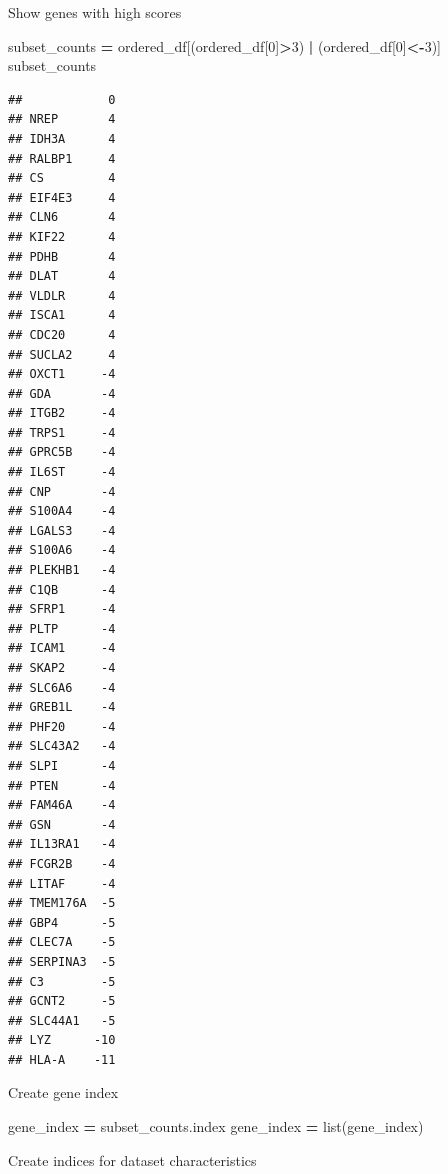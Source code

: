 \documentclass[
]{article}
\newenvironment{Shaded}{\begin{snugshade}}{\end{snugshade}}
\newcommand{\BuiltInTok}[1]{#1}
\newcommand{\CommentTok}[1]{\textcolor[rgb]{0.56,0.35,0.01}{\textit{#1}}}
\newcommand{\ControlFlowTok}[1]{\textcolor[rgb]{0.13,0.29,0.53}{\textbf{#1}}}
\newcommand{\DecValTok}[1]{\textcolor[rgb]{0.00,0.00,0.81}{#1}}
\newcommand{\KeywordTok}[1]{\textcolor[rgb]{0.13,0.29,0.53}{\textbf{#1}}}
\newcommand{\NormalTok}[1]{#1}
\newcommand{\OperatorTok}[1]{\textcolor[rgb]{0.81,0.36,0.00}{\textbf{#1}}}
\newcommand{\StringTok}[1]{\textcolor[rgb]{0.31,0.60,0.02}{#1}}
\begin{document}
Show genes with high scores

\begin{Shaded}
\begin{Highlighting}[]
\NormalTok{subset_counts }\OperatorTok{=}\NormalTok{ ordered_df[(ordered_df[}\DecValTok{0}\NormalTok{]}\OperatorTok{>}\DecValTok{3}\NormalTok{) }\OperatorTok{|}\NormalTok{ (ordered_df[}\DecValTok{0}\NormalTok{]}\OperatorTok{<-}\DecValTok{3}\NormalTok{)]}
\NormalTok{subset_counts}
\end{Highlighting}
\end{Shaded}

\begin{verbatim}
##            0
## NREP       4
## IDH3A      4
## RALBP1     4
## CS         4
## EIF4E3     4
## CLN6       4
## KIF22      4
## PDHB       4
## DLAT       4
## VLDLR      4
## ISCA1      4
## CDC20      4
## SUCLA2     4
## OXCT1     -4
## GDA       -4
## ITGB2     -4
## TRPS1     -4
## GPRC5B    -4
## IL6ST     -4
## CNP       -4
## S100A4    -4
## LGALS3    -4
## S100A6    -4
## PLEKHB1   -4
## C1QB      -4
## SFRP1     -4
## PLTP      -4
## ICAM1     -4
## SKAP2     -4
## SLC6A6    -4
## GREB1L    -4
## PHF20     -4
## SLC43A2   -4
## SLPI      -4
## PTEN      -4
## FAM46A    -4
## GSN       -4
## IL13RA1   -4
## FCGR2B    -4
## LITAF     -4
## TMEM176A  -5
## GBP4      -5
## CLEC7A    -5
## SERPINA3  -5
## C3        -5
## GCNT2     -5
## SLC44A1   -5
## LYZ      -10
## HLA-A    -11
\end{verbatim}

Create gene index

\begin{Shaded}
\begin{Highlighting}[]
\NormalTok{gene_index }\OperatorTok{=}\NormalTok{ subset_counts.index}
\NormalTok{gene_index }\OperatorTok{=} \BuiltInTok{list}\NormalTok{(gene_index)}
\end{Highlighting}
\end{Shaded}

Create indices for dataset characteristics

\begin{Shaded}
\end{Shaded}
\end{document}
